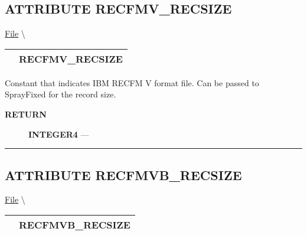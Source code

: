 \subsection*{\textsf{\colorbox{headtoc}{\color{white} ATTRIBUTE}
RECFMV\_RECSIZE}}

\hypertarget{ecldoc:file.recfmv_recsize}{}
\hspace{0pt} \hyperlink{ecldoc:File}{File} \textbackslash 

{\renewcommand{\arraystretch}{1.5}
\begin{tabularx}{\textwidth}{|>{\raggedright\arraybackslash}l|X|}
\hline
\hspace{0pt}\mytexttt{\color{red} } & \textbf{RECFMV\_RECSIZE} \\
\hline
\end{tabularx}
}

\par





Constant that indicates IBM RECFM V format file. Can be passed to SprayFixed for the record size.








\par
\begin{description}
\item [\colorbox{tagtype}{\color{white} \textbf{\textsf{RETURN}}}] \textbf{INTEGER4} --- 
\end{description}




\rule{\linewidth}{0.5pt}
\subsection*{\textsf{\colorbox{headtoc}{\color{white} ATTRIBUTE}
RECFMVB\_RECSIZE}}

\hypertarget{ecldoc:file.recfmvb_recsize}{}
\hspace{0pt} \hyperlink{ecldoc:File}{File} \textbackslash 

{\renewcommand{\arraystretch}{1.5}
\begin{tabularx}{\textwidth}{|>{\raggedright\arraybackslash}l|X|}
\hline
\hspace{0pt}\mytexttt{\color{red} } & \textbf{RECFMVB\_RECSIZE} \\
\hline
\end{tabularx}
}

\par





